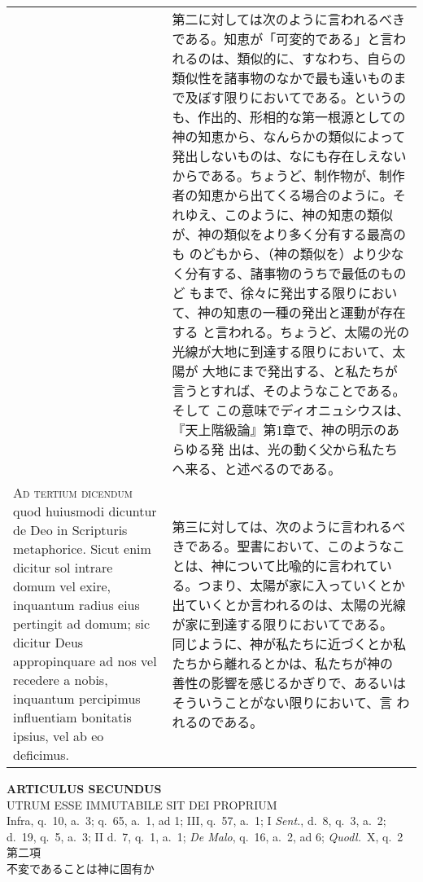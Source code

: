 \documentclass[10pt]{jsarticle} %
\begin{document}
\begin{longtable}{p{21em}p{21em}}
&

第二に対しては次のように言われるべきである。知恵が「可変的である」と言わ
れるのは、類似的に、すなわち、自らの類似性を諸事物のなかで最も遠いものま
で及ぼす限りにおいてである。というのも、作出的、形相的な第一根源としての
神の知恵から、なんらかの類似によって発出しないものは、なにも存在しえない
からである。ちょうど、制作物が、制作者の知恵から出てくる場合のように。そ
れゆえ、このように、神の知恵の類似が、神の類似をより多く分有する最高のも
のどもから、（神の類似を）より少なく分有する、諸事物のうちで最低のものど
もまで、徐々に発出する限りにおいて、神の知恵の一種の発出と運動が存在する
と言われる。ちょうど、太陽の光の光線が大地に到達する限りにおいて、太陽が
大地にまで発出する、と私たちが言うとすれば、そのようなことである。そして
この意味でディオニュシウスは、『天上階級論』第1章で、神の明示のあらゆる発
出は、光の動く父から私たちへ来る、と述べるのである。

\\


{\scshape Ad tertium dicendum} quod huiusmodi dicuntur de Deo in
 Scripturis metaphorice. Sicut enim dicitur sol intrare domum vel exire,
 inquantum radius eius pertingit ad domum; sic dicitur Deus
 appropinquare ad nos vel recedere a nobis, inquantum percipimus
 influentiam bonitatis ipsius, vel ab eo deficimus.

&


第三に対しては、次のように言われるべきである。聖書において、このようなこ
 とは、神について比喩的に言われている。つまり、太陽が家に入っていくとか
 出ていくとか言われるのは、太陽の光線が家に到達する限りにおいてである。
 同じように、神が私たちに近づくとか私たちから離れるとかは、私たちが神の
 善性の影響を感じるかぎりで、あるいはそういうことがない限りにおいて、言
 われるのである。


\end{longtable}
\newpage
{}


\begin{center}
 {\Large {\bf ARTICULUS SECUNDUS}}\\
 {\large UTRUM ESSE IMMUTABILE SIT DEI PROPRIUM}\\
 {\footnotesize Infra, q.~10, a.~3; q.~65, a.~1, ad 1; III, q.~57, a.~1;
 I {\itshape Sent.}, d.~8, q.~3, a.~2; d.~19, q.~5, a.~3; II d.~7, q.~1,
 a.~1; {\itshape De Malo}, q.~16, a.~2, ad 6; {\itshape Quodl.}~X, q.~2}\\
 {\Large 第二項\\不変であることは神に固有か}
\end{center}
\end{document}
